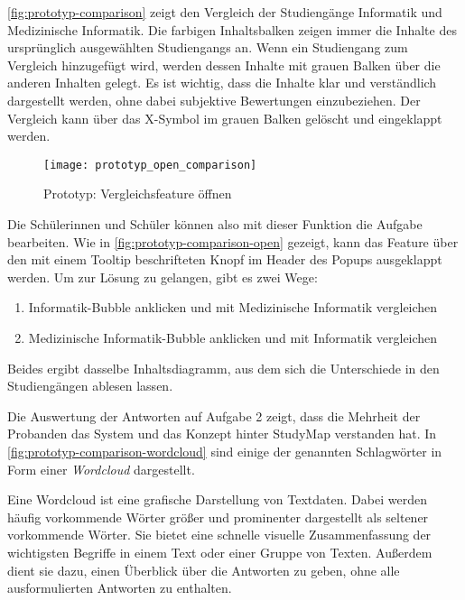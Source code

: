 \autoref{fig:prototyp-comparison} zeigt den Vergleich der Studiengänge Informatik und Medizinische Informatik. Die farbigen Inhaltsbalken zeigen immer die Inhalte des ursprünglich ausgewählten Studiengangs an. Wenn ein Studiengang zum Vergleich hinzugefügt wird, werden dessen Inhalte mit grauen Balken über die anderen Inhalten gelegt. Es ist wichtig, dass die Inhalte klar und verständlich dargestellt werden, ohne dabei subjektive Bewertungen einzubeziehen. Der Vergleich kann über das X-Symbol im grauen Balken gelöscht und eingeklappt werden.

\begin{figure}[H]
    \centering
    \texttt{[image: prototyp\_open\_comparison]}
    \caption{Prototyp: Vergleichsfeature öffnen}
    \label{fig:prototyp-comparison-open}
\end{figure}

Die Schülerinnen und Schüler können also mit dieser Funktion die Aufgabe bearbeiten. Wie in \autoref{fig:prototyp-comparison-open} gezeigt, kann das Feature über den mit einem Tooltip beschrifteten Knopf im Header des Popups ausgeklappt werden. Um zur Lösung zu gelangen, gibt es zwei Wege:

\begin{enumerate}
    \item Informatik-Bubble anklicken und mit Medizinische Informatik vergleichen
    \item \glqq Medizinische Informatik\grqq{}-Bubble anklicken und mit Informatik vergleichen
\end{enumerate}

Beides ergibt dasselbe Inhaltsdiagramm, aus dem sich die Unterschiede in den Studiengängen ablesen lassen.

Die Auswertung der Antworten auf Aufgabe 2 zeigt, dass die Mehrheit der Probanden das System und das Konzept hinter StudyMap verstanden hat. In \autoref{fig:prototyp-comparison-wordcloud} sind einige der genannten Schlagwörter in Form einer \textit{Wordcloud} dargestellt.

Eine Wordcloud ist eine grafische Darstellung von Textdaten. Dabei werden häufig vorkommende Wörter größer und prominenter dargestellt als seltener vorkommende Wörter. Sie bietet eine schnelle visuelle Zusammenfassung der wichtigsten Begriffe in einem Text oder einer Gruppe von Texten. Außerdem dient sie dazu, einen Überblick über die Antworten zu geben, ohne alle ausformulierten Antworten zu enthalten.

